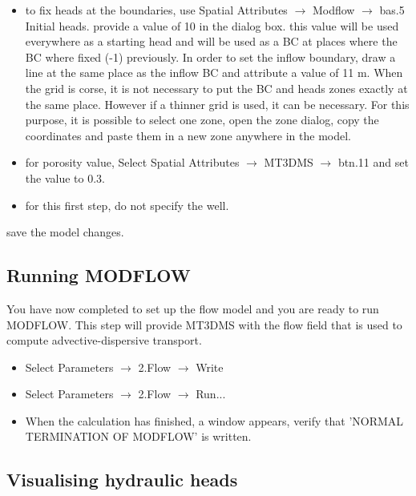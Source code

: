 \begin{itemize}
\item to fix heads at the boundaries, use Spatial Attributes $\rightarrow$ Modflow $\rightarrow$ bas.5 Initial heads. provide a value of 10 in the dialog box.
this value will be used everywhere as a starting head and will be used as a BC at places where the BC where fixed (-1) previously. In order to 
set the inflow boundary, draw a line at the same place as the inflow BC and attribute a value of 11 m. When the grid is corse, it is not necessary 
to put the BC and heads zones exactly at the same place. However if a thinner grid is used, it can be necessary. For this purpose, it is possible to 
select one zone, open the zone dialog, copy the coordinates and paste them in a new zone anywhere in the model.

\item for porosity value, Select Spatial Attributes $\rightarrow$ MT3DMS $\rightarrow$ btn.11 and set the value to 0.3. 

\item for this first step, do not specify the well.

\end{itemize}
save the model changes.

\subsection{Running MODFLOW}

You have now completed to set up the flow model and you are ready to run MODFLOW.
This step will provide MT3DMS with the flow field that is used to compute 
advective-dispersive transport.

\begin{itemize}

\item Select Parameters $\rightarrow$ 2.Flow $\rightarrow$ Write

\item Select Parameters $\rightarrow$ 2.Flow $\rightarrow$ Run...

\item When the calculation has finished, a window appears, verify that 'NORMAL TERMINATION OF MODFLOW' is written.

\end{itemize}

\subsection{Visualising hydraulic heads}

